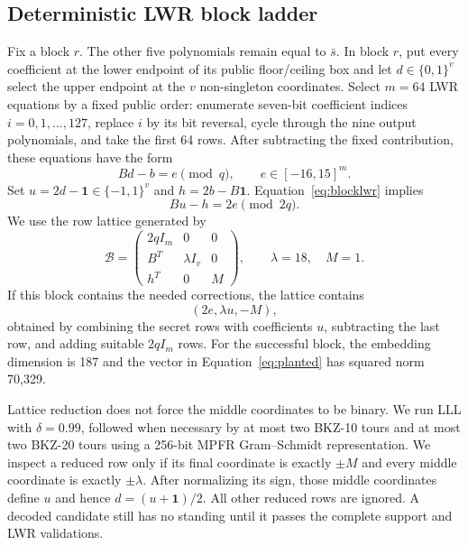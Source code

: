 \documentclass[11pt,a4paper]{article}
\begin{document}
\subsection{Deterministic LWR block ladder}
\label{sec:lattice}

Fix a block $r$.  The other five polynomials remain equal to $\bar s$.  In
block $r$, put every coefficient at the lower endpoint of its public
floor/ceiling box and let $d\in\{0,1\}^v$ select the upper endpoint at the $v$
non-singleton coordinates.  Select $m=64$ LWR equations by a fixed public
order: enumerate seven-bit coefficient indices $i=0,1,\ldots,127$, replace
$i$ by its bit reversal, cycle through the nine output polynomials, and take
the first 64 rows.  After subtracting the fixed contribution, these equations
have the form
\begin{equation}
                         B d-b=e\pmod q,
             \qquad e\in[-16,15]^m.
\label{eq:blocklwr}
\end{equation}
Set $u=2d-\mathbf 1\in\{-1,1\}^v$ and
$h=2b-B\mathbf 1$.  Equation~\eqref{eq:blocklwr} implies
\begin{equation}
                         Bu-h=2e\pmod{2q}.
\label{eq:signedlwr}
\end{equation}
We use the row lattice generated by
\begin{equation}
 \mathcal B=
 \begin{pmatrix}
   2qI_m & 0             & 0\\
   B^T   & \lambda I_v   & 0\\
   h^T   & 0             & M
 \end{pmatrix},
 \qquad \lambda=18,\quad M=1.
\label{eq:embedding}
\end{equation}
If this block contains the needed corrections, the lattice contains
\begin{equation}
       (2e,\lambda u,-M),
\label{eq:planted}
\end{equation}
obtained by combining the secret rows with coefficients $u$, subtracting the
last row, and adding suitable $2qI_m$ rows.  For the successful block, the
embedding dimension is 187 and the vector in Equation~\eqref{eq:planted} has
squared norm 70,329.

Lattice reduction does not force the middle coordinates to be binary.  We run
LLL with $\delta=0.99$, followed when necessary by at most two BKZ-10 tours and
at most two BKZ-20 tours using a 256-bit MPFR Gram--Schmidt representation.  We inspect a
reduced row only if its final coordinate is exactly $\pm M$ and every middle
coordinate is exactly $\pm\lambda$.  After normalizing its sign, those middle
coordinates define $u$ and hence $d=(u+\mathbf1)/2$.  All other reduced rows
are ignored.  A decoded candidate still has no standing until it passes the
complete support and LWR validations.
\end{document}

